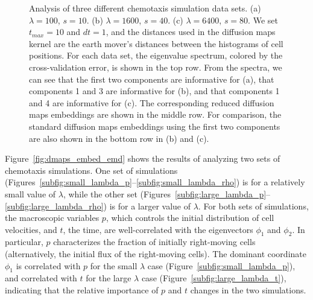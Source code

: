 \documentclass[3p]{elsarticle}
\begin{document}
\begin{figure}[t]
\begin{subfigure}[t]{2in}
\caption{}
\end{subfigure}
%
\caption{Analysis of three different chemotaxis simulation data sets. (a) $\lambda = 100$, $s = 10$. 
(b) $\lambda = 1600$, $s = 40$. (c) $\lambda = 6400$, $s = 80$. We set $t_{max} = 10$ and $dt=1$, and the 
distances used in the diffusion maps kernel are the earth mover's distances between the histograms of cell positions. 
For each data set, the eigenvalue spectrum, colored by the cross-validation error, is shown in the top row. 
From the spectra, we can see that the first two components are informative for (a), that components 1 and 3 are informative for (b), 
and that components 1 and 4 are informative for (c). 
The corresponding reduced diffusion maps embeddings are shown in the middle row. For comparison, 
the standard diffusion maps embeddings using the first two components are also shown in the bottom row in (b) and (c).}
%
\label{fig:chemotaxis_simulations_harmonics}
\end{figure}

Figure~\ref{fig:dmaps_embed_emd} shows the results of analyzing two sets of chemotaxis simulations.
%
One set of simulations (Figures~\ref{subfig:small_lambda_p}--\ref{subfig:small_lambda_rho}) is for a relatively small value of $\lambda$, 
while the other set (Figures~\ref{subfig:large_lambda_p}--\ref{subfig:large_lambda_rho}) is for a larger value of $\lambda$.
%
For both sets of simulations, the macroscopic variables $p$, which controls the initial distribution of cell velocities, and $t$, the time, 
are well-correlated with the eigenvectors $\phi_1$ and $\phi_2$.
%
In particular, $p$ characterizes the fraction of initially right-moving cells (alternatively, the initial flux of the right-moving cells). 
%
%
The dominant coordinate $\phi_1$ is correlated with $p$ for the small $\lambda$ case (Figure~\ref{subfig:small_lambda_p}), 
and correlated with $t$ for the large $\lambda$ case (Figure~\ref{subfig:large_lambda_t}), indicating that the relative 
importance of $p$ and $t$ changes in the two simulations.
%
\end{document}
